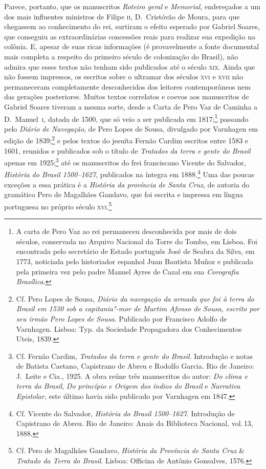 \documentclass[12pt]{extarticle}
\begin{document}
{Parece, portanto, que os manuscritos \textit{Roteiro geral} e
\textit{Memorial}, endereçados a um dos mais influentes ministros de
Filipe 	\textsc{ii}, D.~Cristóvão de Moura, para que chegassem ao conhecimento do
rei, surtiram o efeito esperado por Gabriel Soares, que conseguiu as
extraordinárias concessões reais para realizar sua expedição na
colônia. E, apesar de suas ricas informações (é provavelmente a fonte
documental mais completa a respeito do primeiro século de colonização
do Brasil), não admira que esses textos não tenham sido publicados até
o século \textsc{xix}. Ainda que não fossem impressos, os escritos sobre o
ultramar dos séculos \textsc{xvi} e \textsc{xvii} não permaneceram completamente
desconhecidos dos leitores contemporâneos nem das gerações posteriores.
Muitos textos correlatos e coevos aos manuscritos de Gabriel Soares
tiveram a mesma sorte, desde a Carta de Pero Vaz de Caminha a D.~Manuel~\textsc{i}, 
datada de 1500, que só veio a ser publicada em 1817;\footnote{A
carta de Pero Vaz ao rei permaneceu desconhecida por mais de dois
séculos, conservada no Arquivo Nacional da Torre do Tombo, em Lisboa.
Foi encontrada pelo secretário de Estado português José de Seabra da
Silva, em 1773, noticiada pelo historiador espanhol Juan Bautista Muñoz
e publicada pela primeira vez pelo padre Manuel Ayres de Cazal em sua
\textit{Corografia Brasílica}.} passando pelo
\textit{Diário de Navegação}, de Pero Lopes de Sousa, divulgado por
Varnhagen em edição de 1839;\footnote{ Cf. Pero Lopes de Sousa, \textit{Diário da navegação da armada que 
foi à terra do Brasil em 1530 sob a capitania"-mor de Martim Afonso de Sousa,
escrito por seu irmão Pero Lopes de Sousa}. Publicado por Francisco Adolfo de Varnhagen. 
Lisboa: Typ. da Sociedade Propagadora dos Conhecimentos Uteis, 1839.} e pelos textos do jesuíta Fernão Cardim
escritos entre 1583 e 1601, reunidos e publicados 
sob o título de \textit{Tratados da terra e gente do Brasil} apenas em
1925;\footnote{ Cf. Fernão Cardim, \textit{Tratados da terra e gente do Brasil}. 
Introdução e notas de Batista Caetano, Capistrano de Abreu e Rodolfo Garcia. 
Rio de Janeiro: J.~Leite e Cia., 1925. 
A obra reúne três manuscritos do autor: \textit{Do clima e terra do Brasil}, \textit{Do princípio e Origem dos índios do Brasil}
e \textit{Narrativa Epistolar}, este último havia sido publicado por Varnhagen em 1847.} até os manuscritos do frei franciscano Vicente do Salvador,
\textit{História do Brasil 1500--1627}, publicados na íntegra em 1888.\footnote{ Cf. Vicente do Salvador, \textit{História do Brasil 1500--1627}.
Introdução de Capistrano de Abreu. Rio de Janeiro: Anais da Biblioteca Nacional, vol.\,13, 1888.}
Uma das poucas exceções a essa prática é a \textit{História da
província de Santa Cruz}, de autoria do gramático Pero de
Magalhães Gandavo, que foi escrita e impressa em língua portuguesa no
próprio século \textsc{xvi}.\footnote{ Cf. Pero de Magalhães Gandavo,
\textit{História da Província de Santa Cruz} \& \textit{Tratado da
Terra do Brasil}. Lisboa: Officina de Antônio Gonsalves, 1576.}

}
\end{document}
